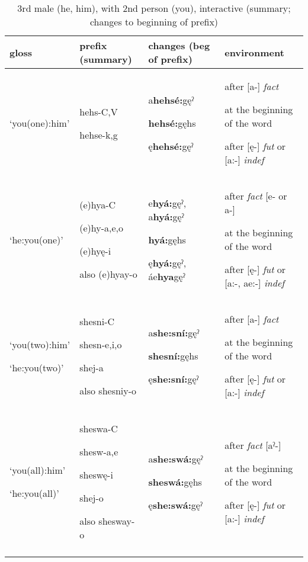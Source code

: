 \lipsum[1-1]

\begin{table}
\caption{3rd male (he, him), with 2nd person (you), interactive (summary; changes to beginning of prefix)}
\label{tab:1:3m2pron}
\tiny{
\begin{tabularx}{\textwidth}{XXXX}
\lsptoprule
gloss & prefix (summary) & changes (beg of prefix) & environment\\
\midrule
‘you(one):him’ & hehs-C,V

hehse-k,g & a\textbf{hehsé:}gęˀ

\textbf{hehsé:}gęhs

ę\textbf{hehsé:}gęˀ & after [a-] \textit{fact}

at the beginning of the word 

after [ę-] \textit{fut} or [a:-] \textit{indef}\\
‘he:you(one)’ & (e)hya-C

(e)hy-a,e,o

(e)hyę-i

also (e)hyay-o & e\textbf{hyá:}gęˀ, a\textbf{hyá:}gęˀ

\textbf{hyá:}gęhs

ę\textbf{hyá:}gęˀ, áe\textbf{hya}gęˀ & after \textit{fact} [e- or a-] 

at the beginning of the word 

after [ę-] \textit{fut} or [a:-, ae:-] \textit{indef}\\
‘you(two):him’

‘he:you(two)’ & shesni-C

shesn-e,i,o

shej-a

also shesniy-o & a\textbf{she:sní:}gęˀ

\textbf{shesní:}gęhs

ę\textbf{she:sní:}gęˀ & after [a-] \textit{fact}

at the beginning of the word 

after [ę-] \textit{fut} or [a:-] \textit{indef}\\
‘you(all):him’

‘he:you(all)’ & sheswa-C

shesw-a,e

sheswę-i

shej-o

also shesway-o & a\textbf{she:swá:}gęˀ

\textbf{sheswá:}gęhs

ę\textbf{she:swá:}gęˀ & after \textit{fact} [aˀ-] 

at the beginning of the word 

after [ę-] \textit{fut} or [a:-] \textit{indef}\\
\lspbottomrule
\end{tabularx}}
\end{table}



